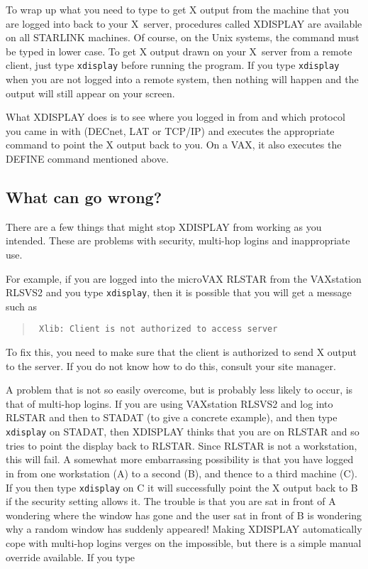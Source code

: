To wrap up what you need to type to get X output from the machine that you are
logged into back to your X~server, procedures called XDISPLAY are available on
all STARLINK machines. Of course, on the Unix systems, the
command must be typed in lower case. To get X output drawn on your X~server
from a remote client, just type {\tt xdisplay} before running the program. If
you type {\tt xdisplay} when you are not logged into a remote system, then
nothing will happen and the output will still appear on your screen.

What XDISPLAY does is to see where you logged in from and which protocol you
came in with (DECnet, LAT or TCP/IP) and executes the appropriate command to
point the X output back to you. On a VAX, it also executes the DEFINE command
mentioned above.

\subsection{What can go wrong?}

There are a few things that might stop XDISPLAY from working as you intended.
These are problems with security, multi-hop logins and inappropriate use.

For example, if you are logged into the microVAX RLSTAR from the VAXstation
RLSVS2 and you type {\tt xdisplay}, then it is possible that you will get a
message such as 

\begin{quote}{\tt
Xlib:  Client is not authorized to access server
}
\end{quote}

To fix this, you need to make sure that the client is authorized to send X
output to the server. If you do not know how to do this, consult your site
manager.

A problem that is not so easily overcome, but is probably less likely to occur,
is that of multi-hop logins. If you are using VAXstation RLSVS2 and log into
RLSTAR and then to STADAT (to give a concrete example), and then type {\tt
xdisplay} on STADAT, then XDISPLAY thinks that you are on RLSTAR and so tries
to point the display back to RLSTAR. Since RLSTAR is not a workstation, this
will fail. A somewhat more embarrassing possibility is that you have
logged in from one workstation (A) to a second (B), and thence to a third
machine (C). If you then type {\tt xdisplay} on C it will successfully point
the X output back to B if the security setting allows it. The trouble is that
you are sat in front of A wondering where the window has gone and the user sat
in front of B is wondering why a random window has suddenly appeared! Making
XDISPLAY automatically cope with multi-hop logins verges on the impossible, but
there is a simple manual override available. If you type

